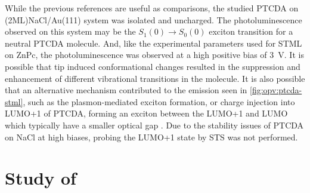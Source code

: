 While the previous references are useful as comparisons, the studied PTCDA on (2ML)NaCl/Au(111) system was isolated and uncharged. The photoluminescence observed on this system may be the $S_1(0) \rightarrow S_0(0)$ exciton transition for a neutral PTCDA molecule. And, like the experimental parameters used for \ac{STML} on ZnPc, the photoluminescence was observed at a high positive bias of \SI{3}{V}. It is possible that tip induced conformational changes resulted in the suppression and enhancement of different vibrational transitions in the molecule. It is also possible that an alternative mechanism contributed to the emission seen in \autoref{fig:opv:ptcda-stml}, such as the plasmon-mediated exciton formation, or charge injection into LUMO+1 of PTCDA, forming an exciton between the LUMO+1 and LUMO which typically have a smaller optical gap \citep{Wu2008}. Due to the stability issues of PTCDA on NaCl at high biases, probing the LUMO+1 state by \ac{STS} was not performed.
















\section{Study of }

